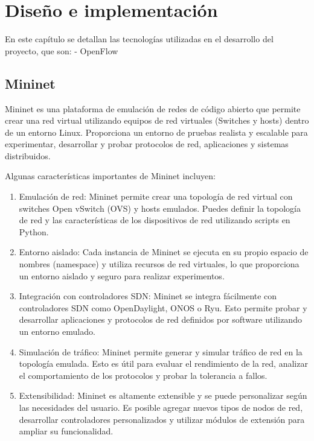 \documentclass[a4paper, 12pt]{book}
\begin{document}
	\chapter{Diseño e implementación}
	\label{sec:diseno}
	 
		
	En este capítulo se detallan las tecnologías utilizadas en el desarrollo del proyecto, que son:
	- OpenFlow
	
	
	\section{Mininet} 
	\label{sec:mininet}
	
	Mininet es una plataforma de emulación de redes de código abierto que permite crear una red virtual utilizando equipos de red virtuales (Switches y hosts) dentro de un entorno Linux. Proporciona un entorno de pruebas realista y escalable para experimentar, desarrollar y probar protocolos de red, aplicaciones y sistemas distribuidos.
	
	Algunas características importantes de Mininet incluyen:
	
	\begin{enumerate}
		\item 	Emulación de red: Mininet permite crear una topología de red virtual con switches Open vSwitch (OVS) y hosts emulados. Puedes definir la topología de red y las características de los dispositivos de red utilizando scripts en Python.
		\item 	Entorno aislado: Cada instancia de Mininet se ejecuta en su propio espacio de nombres (namespace) y utiliza recursos de red virtuales, lo que proporciona un entorno aislado y seguro para realizar experimentos.
		\item 	Integración con controladores SDN: Mininet se integra fácilmente con controladores SDN como OpenDaylight, ONOS o Ryu. Esto permite probar y desarrollar aplicaciones y protocolos de red definidos por software utilizando un entorno emulado.
		\item 	Simulación de tráfico: Mininet permite generar y simular tráfico de red en la topología emulada. Esto es útil para evaluar el rendimiento de la red, analizar el comportamiento de los protocolos y probar la tolerancia a fallos.
		\item   Extensibilidad: Mininet es altamente extensible y se puede personalizar según las necesidades del usuario. Es posible agregar nuevos tipos de nodos de red, desarrollar controladores personalizados y utilizar módulos de extensión para ampliar su funcionalidad.
	\end{enumerate}
	
\end{document}
